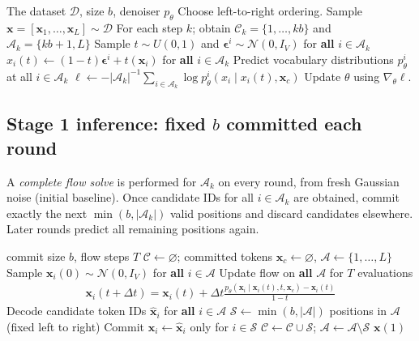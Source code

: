\documentclass[11pt,a4paper]{article}
\newcommand{\C}{\mathcal C}
\newcommand{\A}{\mathcal A}
\newcommand{\Sset}{\mathcal S}
\newcommand{\N}{\mathcal N}
\begin{document}
\begin{algorithm}[htbp]
\caption{Stage 1 training}\label{alg:train}
\begin{algorithmic}[1]
\Require The dataset $\mathcal{D}$, size $b$, denoiser $p_\theta$
\State Choose left-to-right ordering.
\State Sample $\bm{x} = [\bm{x}_1, \ldots, \bm{x}_{L}] \sim \mathcal{D}$
\State For each step $k$; obtain $\C_k = \{1,\ldots, kb\}$ and $\A_k= \{kb+1, L\}$
\State Sample $t\sim U(0,1)$ and $\bm{\epsilon}^i\sim\N(0,I_V)$ for \textbf{all} $i\in\A_k$
\State $x_i(t)\gets(1-t)\bm{\epsilon}^i+t (\bm{x}_i)$ for \textbf{all} $i\in\A_k$
\State Predict vocabulary distributions $p_\theta^i$ at all $i\in\A_k$
\State $\ell\gets-|\A_k|^{-1}\sum_{i\in\A_k}\log p_\theta^i(x_i\mid x_i(t), \bm{x}_{c})$
\State Update $\theta$ using $\nabla_\theta\ell$.
\end{algorithmic}
\end{algorithm}

\subsection{Stage 1 inference: fixed $b$ committed each round}
A \emph{complete flow solve} is performed for $\A_k$ on every round, from fresh Gaussian noise (initial baseline). Once candidate IDs for all $i\in\A_k$ are obtained, commit exactly the next $\min(b,|\A_k|)$ valid positions and discard candidates elsewhere. Later rounds predict all remaining positions again.
\begin{algorithm}[htbp]
\caption{Stage 1 inference: all remaining flow, fixed commitment}\label{alg:infer}
\begin{algorithmic}[1]
\Require commit size $b$, flow steps $T$
\State $\C\gets\varnothing$; committed tokens $\bm{x}_c\gets\varnothing$, $\A \gets \{1, \ldots,L \}$
\While{$\A\ne\varnothing$}
  \State Sample $\bm{x}_i(0)\sim\N(0,I_V)$ for \textbf{all} $i\in\A$
  \State Update flow on \textbf{all} $\A$ for $T$ evaluations
  \begin{align}
      \nonumber \bm{x}_{i}(t + \Delta t) = \bm{x}_i(t) + \Delta t \frac{p_{\theta}(\bm{x}_i \mid \bm{x}_i(t), t, \bm{x}_c) - \bm{x}_i(t)}{1 - t}
  \end{align}
  \State Decode candidate token IDs $ \hat{\bm{x}}_i$ for \textbf{all} $i\in\A$
  \State $\Sset\gets$$\min(b,|\A|)$ positions in $\A$ (fixed left to right)
  \State Commit $\bm{x}_i\gets\hat{\bm{x}}_i$ only for $i\in\Sset$
  \State $\C\gets\C\cup\Sset$; $\A\gets\A\setminus\Sset$
\EndWhile
\State \Return $\bm{x}(1)$
\end{algorithmic}
\end{algorithm}
\end{document}

